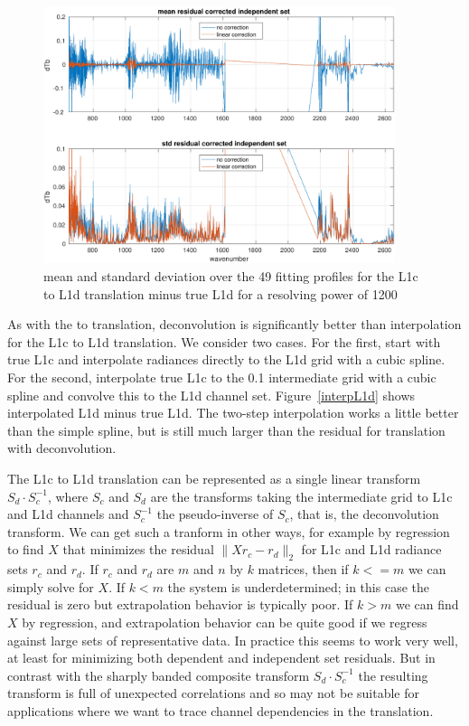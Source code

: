 \documentclass[11pt]{article}
\begin{document}
\begin{figure} %
  \centering
  \includegraphics[height=7.5cm]{figures/L1d_corr_700.pdf}
  \caption{mean and standard deviation over the 49 fitting profiles
    for the L1c to L1d translation minus true L1d for a resolving
    power of 1200}
  \label{L1d700s}
\end{figure}

As with the {\airs} to {\cris} translation, deconvolution is
significantly better than interpolation for the L1c to L1d
translation.  We consider two cases.  For the first, start with true
L1c and interpolate radiances directly to the L1d grid with a cubic
spline.  For the second, interpolate true L1c to the 0.1 {\wn}
intermediate grid with a cubic spline and convolve this to the L1d
channel set.  Figure~\ref{interpL1d} shows interpolated L1d minus
true L1d.  The two-step interpolation works a little better than the
simple spline, but is still much larger than the residual for
translation with deconvolution.

The L1c to L1d translation can be represented as a single linear
transform $S_d\cdot S_c^{-1}$, where $S_c$ and $S_d$ are the
transforms taking the intermediate grid to L1c and L1d channels and
$S_c^{-1}$ the pseudo-inverse of $S_c$, that is, the deconvolution
transform.  We can get such a tranform in other ways, for example by
regression to find $X$ that minimizes the residual $\|X r_c -
r_d\|_2$ for L1c and L1d radiance sets $r_c$ and $r_d$.  If $r_c$ and
$r_d$ are $m$ and $n$ by $k$ matrices, then if $k <= m$ we can simply
solve for $X$.  If $k < m$ the system is underdetermined; in this
case the residual is zero but extrapolation behavior is typically
poor.  If $k > m$ we can find $X$ by regression, and extrapolation
behavior can be quite good if we regress against large sets of
representative data.  In practice this seems to work very well, at
least for minimizing both dependent and independent set residuals.
But in contrast with the sharply banded composite transform $S_d\cdot
S_c^{-1}$ the resulting transform is full of unexpected correlations
and so may not be suitable for applications where we want to trace
channel dependencies in the translation.
\end{document}
